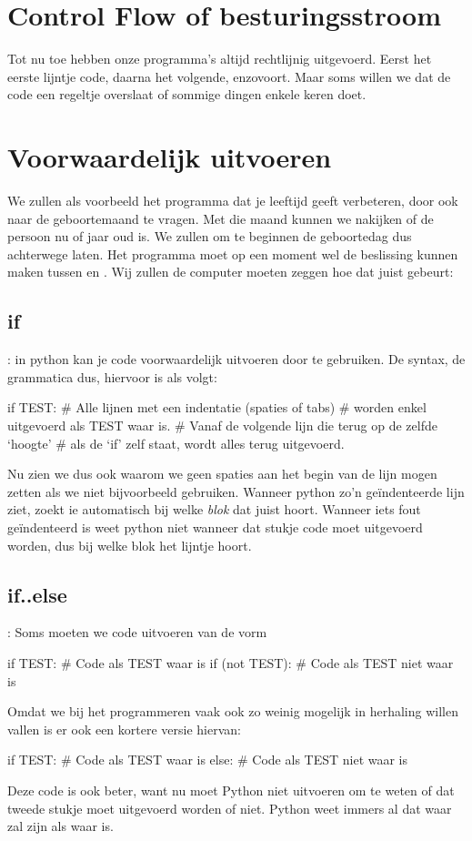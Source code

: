 
\section*{Control Flow of besturingsstroom}
  Tot nu toe hebben onze programma's altijd rechtlijnig uitgevoerd. Eerst het
  eerste lijntje code, daarna het volgende, enzovoort. Maar soms willen we dat
  de code een regeltje overslaat of sommige dingen enkele keren doet.
\section{Voorwaardelijk uitvoeren}
  We zullen als voorbeeld het programma dat je leeftijd geeft verbeteren, door
  ook naar de geboortemaand te vragen. Met die maand kunnen we nakijken of de
  persoon nu  of  jaar oud is. We zullen om te
  beginnen de geboortedag dus achterwege laten. Het programma moet op een moment
  wel de beslissing kunnen maken tussen  en . Wij
  zullen de computer moeten zeggen hoe dat juist gebeurt:
  \subsection{if}: in python kan je code voorwaardelijk uitvoeren door 
  te gebruiken. De syntax, de grammatica dus, hiervoor is als volgt:
  \begin{python}
    if TEST:
      # Alle lijnen met een indentatie (spaties of tabs)
      # worden enkel uitgevoerd als TEST waar is.
    # Vanaf de volgende lijn die terug op de zelfde `hoogte'
    # als de `if' zelf staat, wordt alles terug uitgevoerd.
  \end{python}
  Nu zien we dus ook waarom we geen spaties aan het begin van de lijn mogen
  zetten als we niet bijvoorbeeld  gebruiken. Wanneer python zo'n
  ge\"indenteerde lijn ziet, zoekt ie automatisch bij welke \emph{blok} dat
  juist hoort. Wanneer iets fout ge\"indenteerd is weet python niet wanneer dat
  stukje code moet uitgevoerd worden, dus bij welke blok het lijntje hoort.

  \subsection{if..else}: Soms moeten we code uitvoeren van de vorm
  \begin{python}
    if TEST:
      # Code als TEST waar is
    if (not TEST):
      # Code als TEST niet waar is
  \end{python}
  Omdat we bij het programmeren vaak ook zo weinig mogelijk in herhaling willen
  vallen is er ook een kortere versie hiervan:
  \begin{python}
    if TEST:
      # Code als TEST waar is
    else:
      # Code als TEST niet waar is
  \end{python}
  Deze code is ook beter, want nu moet Python niet  uitvoeren
  om te weten of dat tweede stukje moet uitgevoerd worden of niet. Python weet
  immers al dat  waar zal zijn als  waar is.

